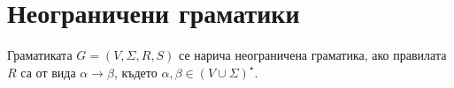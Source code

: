 
\section{Неограничени граматики}

\begin{dfn}
  Граматиката $G = (V,\Sigma,R,S)$
  се нарича неограничена граматика, 
  ако правилата $R$ са от вида $\alpha \to \beta$,
  където $\alpha,\beta \in (V\cup\Sigma)^\star$.
\end{dfn}


